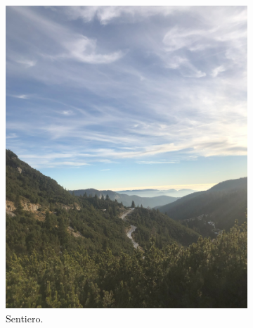 \documentclass{article}
\begin{document}
\begin{figure}[htbp!]
    \centering
    \begin{subfigure}[b]{0.45\textwidth}
        \includegraphics[width=\textwidth]{images/foto_sentiero.jpg}
        \caption{Sentiero.}
    \end{subfigure}
    \hfill
    \begin{subfigure}[b]{0.45\textwidth}

\end{subfigure}
\end{figure}
\end{document}
